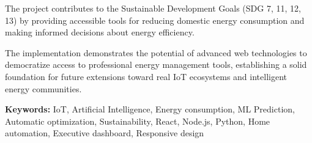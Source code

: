 \documentclass[12pt,a4paper,spanish]{book}
\begin{document}
The project contributes to the Sustainable Development Goals (SDG 7, 11, 12, 13) by providing accessible tools for reducing domestic energy consumption and making informed decisions about energy efficiency.

The implementation demonstrates the potential of advanced web technologies to democratize access to professional energy management tools, establishing a solid foundation for future extensions toward real IoT ecosystems and intelligent energy communities.

\textbf{Keywords:} IoT, Artificial Intelligence, Energy consumption, ML Prediction, Automatic optimization, Sustainability, React, Node.js, Python, Home automation, Executive dashboard, Responsive design

\tableofcontents
\clearpage
\listoffigures
\clearpage
\listoftables


\mainmatter














\backmatter

\printbibliography[heading=bibintoc,title={Referencias Bibliográficas}]

% 
% 
% 
% 
\end{document}
